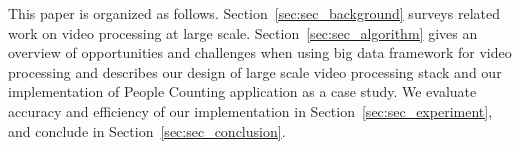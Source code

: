 This paper is organized as follows. Section~\ref{sec:sec_background} surveys
related work on video processing at large scale.
Section~\ref{sec:sec_algorithm} gives an overview of opportunities and
challenges when using big data framework for video processing and describes our
design of large scale video processing stack and our implementation of
People Counting application as a case study. We evaluate accuracy and efficiency
of our implementation in Section~\ref{sec:sec_experiment}, and conclude in
Section~\ref{sec:sec_conclusion}.
